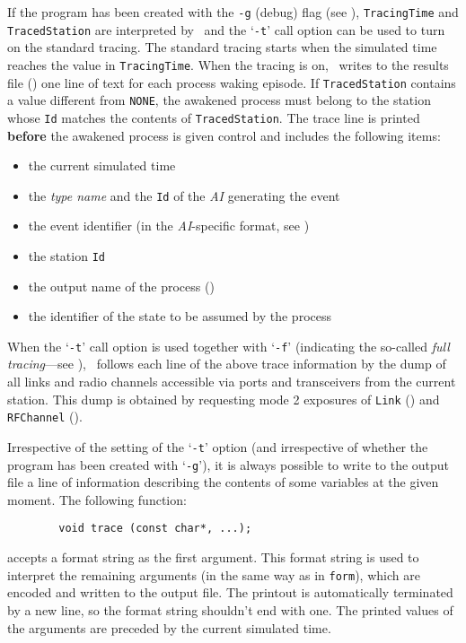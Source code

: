 If the program has been created with the {\tt -g} (debug) flag (see
), {\tt TracingTime} and {\tt TracedStation} are
interpreted by
\smurph\ and the `{\tt -t}' call
option can be used to turn on the standard tracing.
The standard tracing starts when the simulated time reaches the value in
{\tt TracingTime}.
When the tracing is on, \smurph\ writes to the results file
()
one line of text for each process waking episode.
If {\tt TracedStation} contains a value different from {\tt NONE},
the awakened process must belong to the station whose {\tt Id} matches the
contents of {\tt TracedStation}.
The trace line is printed {\bf before} the awakened process is given
control and includes the following items:
\begin{itemize}
\item
the current simulated time
\item
the {\em type name\/} and the {\tt Id} of the {\em AI\/} generating the event
\item
the event identifier (in the {\em AI\/}-specific format, see )
\item
the station {\tt Id}
\item
the output name of the process ()
\item
the identifier of the state to be assumed by the process
\end{itemize}

When the `{\tt -t}' call option is used together with `{\tt -f}'
(indicating the
so-called {\em full tracing\/}---see ),
\smurph\ follows each line of the above trace information by the
dump of all links and radio channels accessible via
ports and transceivers from the current station.
This dump is obtained by requesting mode 2 exposures of
{\tt Link} () and {\tt RFChannel}
().

Irrespective of the setting of the `{\tt -t}' option (and irrespective of
whether the program has been created with `{\tt -g}'), it is always possible
to write to the output file a line of information describing the contents
of some variables at the given moment.
The following function:
\begin{verbatim}
        void trace (const char*, ...);
\end{verbatim}
accepts a format string as the first argument.
This format string is used to interpret the remaining arguments (in the same way
as in {\tt form}), which are encoded and written to the output file.
The printout is automatically terminated by a new line, so the format string
shouldn't end with one.
The printed values of the arguments are preceded by the current simulated
time.

